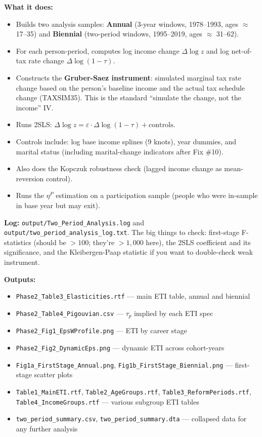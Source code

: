 \documentclass[11pt, letterpaper]{article}
\newcommand{\logfile}[1]{\texttt{#1}}
\newcommand{\outputfile}[1]{\texttt{#1}}
\begin{document}
\textbf{What it does:}
\begin{itemize}
    \item Builds two analysis samples: \textbf{Annual} (3-year windows, 1978--1993, ages $\approx$ 17--35) and \textbf{Biennial} (two-period windows, 1995--2019, ages $\approx$ 31--62).
    \item For each person-period, computes log income change $\Delta \log z$ and log net-of-tax rate change $\Delta \log(1-\tau)$.
    \item Constructs the \textbf{Gruber-Saez instrument}: simulated marginal tax rate change based on the person's baseline income and the actual tax schedule change (TAXSIM35). This is the standard ``simulate the change, not the income'' IV.
    \item Runs 2SLS: $\Delta \log z = \varepsilon \cdot \Delta \log(1-\tau) + \text{controls}$.
    \item Controls include: log base income splines (9 knots), year dummies, and marital status (including marital-change indicators after Fix \#10).
    \item Also does the Kopczuk robustness check (lagged income change as mean-reversion control).
    \item Runs the $\eta^P$ estimation on a participation sample (people who were in-sample in base year but may exit).
\end{itemize}

\textbf{Log:} \logfile{output/Two\_Period\_Analysis.log} and \logfile{output/two\_period\_analysis\_log.txt}. The big things to check: first-stage F-statistics (should be $> 100$; they're $> 1{,}000$ here), the 2SLS coefficient and its significance, and the Kleibergen-Paap statistic if you want to double-check weak instrument.

\textbf{Outputs:}
\begin{itemize}
    \item \outputfile{Phase2\_Table3\_Elasticities.rtf} --- main ETI table, annual and biennial
    \item \outputfile{Phase2\_Table4\_Pigouvian.csv} --- $\tau_p$ implied by each ETI spec
    \item \outputfile{Phase2\_Fig1\_EpsWProfile.png} --- ETI by career stage
    \item \outputfile{Phase2\_Fig2\_DynamicEps.png} --- dynamic ETI across cohort-years
    \item \outputfile{Fig1a\_FirstStage\_Annual.png}, \outputfile{Fig1b\_FirstStage\_Biennial.png} --- first-stage scatter plots
    \item \outputfile{Table1\_MainETI.rtf}, \outputfile{Table2\_AgeGroups.rtf}, \outputfile{Table3\_ReformPeriods.rtf}, \outputfile{Table4\_IncomeGroups.rtf} --- various subgroup ETI tables
    \item \outputfile{two\_period\_summary.csv}, \outputfile{two\_period\_summary.dta} --- collapsed data for any further analysis
\end{itemize}
\end{document}
